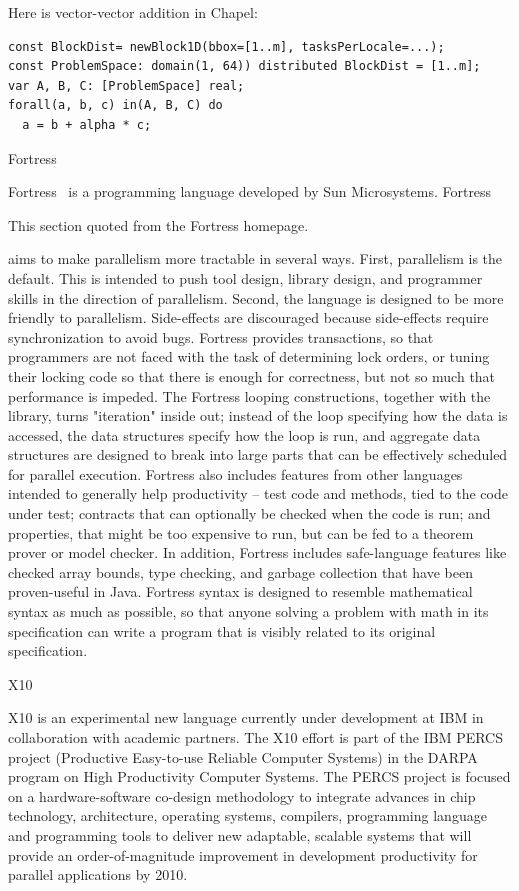Here is vector-vector addition in Chapel:
\begin{verbatim}
const BlockDist= newBlock1D(bbox=[1..m], tasksPerLocale=...);
const ProblemSpace: domain(1, 64)) distributed BlockDist = [1..m];
var A, B, C: [ProblemSpace] real;
forall(a, b, c) in(A, B, C) do
  a = b + alpha * c;
\end{verbatim}


 {Fortress}

Fortress~\cite{Fortress:homepage} is a programming language developed
by Sun Microsystems.  Fortress
\begin{footnoteenv}
  {This section quoted from the
    Fortress homepage.}
\end{footnoteenv}
aims to make parallelism more tractable
in several ways. First, parallelism is the default. This is intended
to push tool design, library design, and programmer skills in the
direction of parallelism. Second, the language is designed to be more
friendly to parallelism. Side-effects are discouraged because
side-effects require synchronization to avoid bugs. Fortress provides
transactions, so that programmers are not faced with the task of
determining lock orders, or tuning their locking code so that there is
enough for correctness, but not so much that performance is
impeded. The Fortress looping constructions, together with the
library, turns "iteration" inside out; instead of the loop specifying
how the data is accessed, the data structures specify how the loop is
run, and aggregate data structures are designed to break into large
parts that can be effectively scheduled for parallel
execution. Fortress also includes features from other languages
intended to generally help productivity -- test code and methods, tied
to the code under test; contracts that can optionally be checked when
the code is run; and properties, that might be too expensive to run,
but can be fed to a theorem prover or model checker. In addition,
Fortress includes safe-language features like checked array bounds,
type checking, and garbage collection that have been proven-useful in
Java. Fortress syntax is designed to resemble mathematical syntax as
much as possible, so that anyone solving a problem with math in its
specification can write a program that is visibly related to
its original specification.


 {X10}

X10 is an experimental new language currently under development at
IBM in collaboration with academic partners. The X10 effort
is part of the IBM PERCS project (Productive Easy-to-use Reliable
Computer Systems) in the DARPA program on High Productivity Computer
Systems. The PERCS project is focused on a hardware-software co-design
methodology to integrate advances in chip technology, architecture,
operating systems, compilers, programming language and programming
tools to deliver new adaptable, scalable systems that will provide an
order-of-magnitude improvement in development productivity for
parallel applications by 2010.

